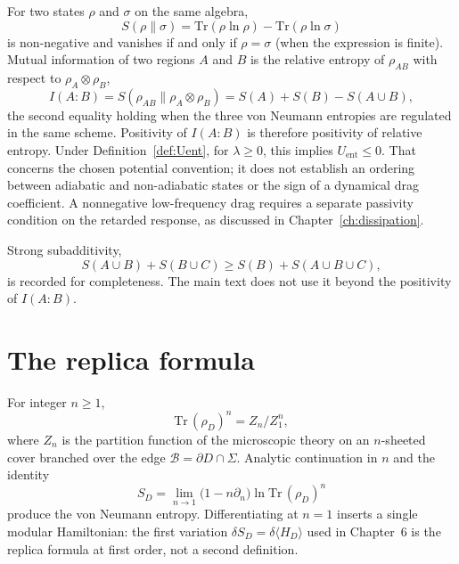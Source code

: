 For two states \(\rho\) and \(\sigma\) on the same algebra,
\begin{equation}
  \label{eq:appB-rel}
  S(\rho\|\sigma)
  =\mathrm{Tr}(\rho\ln\rho)-\mathrm{Tr}(\rho\ln\sigma)
\end{equation}
is non-negative and vanishes if and only if \(\rho=\sigma\)
(when the expression is finite). Mutual information of two
regions \(A\) and \(B\) is the relative entropy of \(\rho_{AB}\)
with respect to \(\rho_A\otimes\rho_B\),
\begin{equation}
  \label{eq:appB-MI}
  I(A:B)
  =S(\rho_{AB}\|\rho_A\otimes\rho_B)
  =S(A)+S(B)-S(A\cup B),
\end{equation}
the second equality holding when the three von Neumann entropies
are regulated in the same scheme. Positivity of \(I(A:B)\) is
therefore positivity of relative entropy. Under
Definition~\ref{def:Uent}, for \(\lambda\ge0\), this implies
\(U_{\mathrm{ent}}\le0\). That concerns the chosen potential
convention; it does not establish an ordering between adiabatic and
non-adiabatic states or the sign of a dynamical drag coefficient. A
nonnegative low-frequency drag requires a separate passivity
condition on the retarded response, as discussed in
Chapter~\ref{ch:dissipation}.

Strong subadditivity,
\begin{equation}
  \label{eq:appB-SSA}
  S(A\cup B)+S(B\cup C)
  \ge S(B)+S(A\cup B\cup C),
\end{equation}
is recorded for completeness. The main text does not use it
beyond the positivity of \(I(A:B)\).

\section{The replica formula}
\label{sec:appB-replica}

For integer \(n\ge 1\),
\begin{equation}
  \label{eq:appB-replica}
  \mathrm{Tr}\,(\rho_D)^n
  =Z_n/Z_1^n,
\end{equation}
where \(Z_n\) is the partition function of the microscopic theory
on an \(n\)-sheeted cover branched over the edge
\(\mathcal{B}=\partial D\cap\Sigma\). Analytic continuation in
\(n\) and the identity
\begin{equation}
  \label{eq:appB-replica-S}
  S_D
  =\lim_{n\to 1}
   \bigl(1-n\partial_n\bigr)\ln\mathrm{Tr}\,(\rho_D)^n
\end{equation}
produce the von Neumann entropy. Differentiating at \(n=1\)
inserts a single modular Hamiltonian: the first variation
\(\delta S_D=\delta\langle H_D\rangle\) used in Chapter~6 is the
replica formula at first order, not a second definition.

